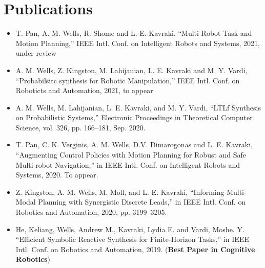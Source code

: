 \section{Publications}

\vspace{6pt}

\begin{itemize}

\item[]{T. Pan, A. M. Wells, R. Shome and L. E. Kavraki, ``Multi-Robot Task and Motion Planning,'' IEEE Intl. Conf. on Intelligent Robots and Systems, 2021, under review}

\vspace{1em} 

\item[] {A. M. Wells, Z. Kingston, M. Lahijanian, L. E. Kavraki and M. Y. Vardi, ``Probabilsitc synthesis for Robotic Manipulation,'' IEEE Intl. Conf. on Roboticts and Automation, 2021, to appear}

\vspace{1em} 

\item[]{A. M. Wells, M. Lahijanian, L. E. Kavraki, and M. Y. Vardi, “LTLf Synthesis on Probabilistic Systems,” Electronic Proceedings in Theoretical Computer Science, vol. 326, pp. 166–181, Sep. 2020.}

\vspace{1em} 

\item[]{T. Pan, C. K. Verginis, A. M. Wells, D.V. Dimarogonas and L. E. Kavraki, “Augmenting Control Policies with Motion Planning for Robust and Safe Multi-robot Navigation,” in IEEE Intl. Conf. on Intelligent Robots and Systems, 2020. To appear.}

\vspace{1em} 

\item[]{Z. Kingston, A. M. Wells, M. Moll, and L. E. Kavraki, “Informing Multi-Modal Planning with Synergistic Discrete Leads,” in IEEE Intl. Conf. on Robotics and Automation, 2020, pp. 3199–3205.}

\vspace{1em} 

\item[]{He, Keliang, Wells, Andrew M., Kavraki, Lydia E. and Vardi, Moshe. Y.  “Efficient Symbolic Reactive Synthesis for Finite-Horizon Tasks,” in IEEE Intl. Conf. on Robotics and Automation, 2019. (\textbf{Best Paper in Cognitive Robotics})}


\end{itemize}
